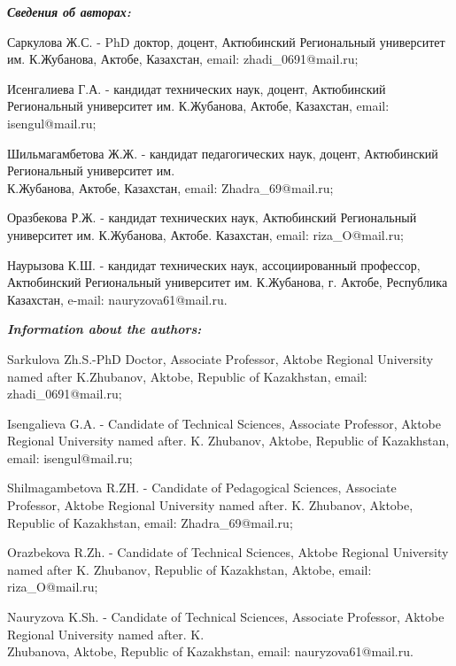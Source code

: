 \begin{authorinfo}
\emph{{\bfseries Сведения об авторах:}}

Саркулова Ж.С. - PhD доктор, доцент, Актюбинский Региональный университет
им. К.Жубанова, Актобе, Казахстан, email: zhadi\_0691@mail.ru;

Исенгалиева Г.А. - кандидат технических наук, доцент, Актюбинский
Региональный университет им. К.Жубанова, Актобе, Казахстан, email:
isengul@mail.ru;

Шильмагамбетова Ж.Ж. - кандидат педагогических наук, доцент, Актюбинский
Региональный университет им. \\К.Жубанова, Актобе, Казахстан, email:
Zhadra\_69@mail.ru;

Оразбекова Р.Ж. - кандидат технических наук, Актюбинский Региональный
университет им. К.Жубанова, Актобе. Казахстан, email: riza\_O@mail.ru;

Наурызова К.Ш. - кандидат технических наук, ассоциированный профессор,
Актюбинский Региональный университет им. К.Жубанова, г. Актобе,
Республика Казахстан, e-mail: nauryzova61@mail.ru.

\emph{{\bfseries Information about the authors:}}

Sarkulova Zh.S.-PhD Doctor, Associate Professor, Aktobe Regional
University named after K.Zhubanov, Aktobe, Republic of Kazakhstan,
email: zhadi\_0691@mail.ru;

Isengalieva G.A. - Candidate of Technical Sciences, Associate Professor,
Aktobe Regional University named after. K. Zhubanov, Aktobe, Republic of
Kazakhstan, email: isengul@mail.ru;

Shilmagambetova R.ZH. - Candidate of Pedagogical Sciences, Associate
Professor, Aktobe Regional University named after. K. Zhubanov, Aktobe,
Republic of Kazakhstan, email: Zhadra\_69@mail.ru;

Orazbekova R.Zh. - Candidate of Technical Sciences, Aktobe Regional
University named after K. Zhubanov, Republic of Kazakhstan, Aktobe,
email: riza\_O@mail.ru;

Nauryzova K.Sh. - Candidate of Technical Sciences, Associate Professor,
Aktobe Regional University named after. K. \\Zhubanova, Aktobe, Republic
of Kazakhstan, email: nauryzova61@mail.ru.
\end{authorinfo}

